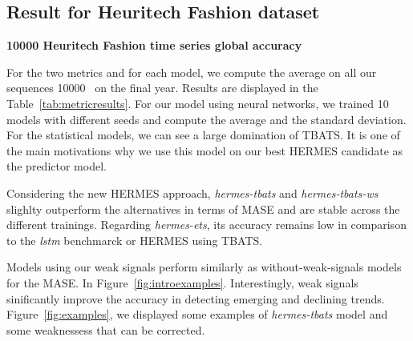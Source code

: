\documentclass{article} %
\newcommand{\numberts}{10000}
\begin{document}







\subsection{Result for Heuritech Fashion dataset}





\textbf{10000 Heuritech Fashion time series global accuracy}

For the two metrics and for each model, we compute the average on all our sequences \numberts~  on the final year. Results are displayed in the Table~\ref{tab:metricresults}. For our model using neural networks, we trained 10 models with different seeds and compute the average and the standard deviation. For the statistical models, we can see a large domination of TBATS. It is one of the main motivations why we use this model on our best HERMES candidate as the predictor model. %

Considering the new HERMES approach, \textit{hermes-tbats} and \textit{hermes-tbats-ws} slighlty outperform the alternatives   in terms of MASE and are stable across the different trainings. Regarding \textit{hermes-ets},  its accuracy remains low in comparison to the \textit{lstm} benchmarck or HERMES using TBATS. 

Models using our weak signals perform similarly as without-weak-signals models for the MASE. In Figure~\ref{fig:introexamples}. Interestingly, weak signals sinificantly improve the accuracy in detecting emerging and declining trends. Figure~\ref{fig:examples}, we displayed some examples of \textit{hermes-tbats} model and some weaknessess that can be corrected.
\end{document}
